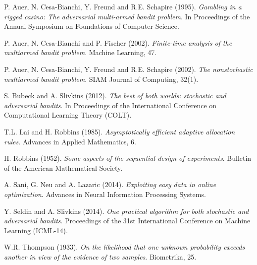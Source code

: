 \documentclass[11pt]{article}
\begin{document}
\pagebreak

\begin{thebibliography}{1}

 P. Auer, N. Cesa-Bianchi, Y. Freund and R.E. Schapire (1995). {\em Gambling in a rigged casino: The adversarial multi-armed bandit problem}. In Proceedings of the Annual Symposium on Foundations of Computer Science.

 P. Auer, N. Cesa-Bianchi and P. Fischer (2002). {\em Finite-time analysis of the multiarmed bandit problem}. Machine Learning, 47.

 P. Auer, N. Cesa-Bianchi, Y. Freund and R.E. Schapire (2002). {\em The nonstochastic multiarmed bandit problem}. SIAM Journal of Computing, 32(1).

 S. Bubeck and A. Slivkins (2012). {\em The best of both worlds: stochastic and adversarial bandits}. In Proceedings of the International Conference on Computational Learning Theory (COLT).

 T.L. Lai and H. Robbins (1985). {\em Asymptotically efficient adaptive allocation rules}. Advances in Applied Mathematics, 6.

 H. Robbins (1952). {\em Some aspects of the sequential design of experiments}.  Bulletin of the American Mathematical Society.

 A. Sani, G. Neu and A. Lazaric (2014). {\em Exploiting easy data in online optimization}.  Advances in Neural Information Processing Systems.

 Y. Seldin and A. Slivkins (2014). {\em One practical algorithm for both stochastic and adversarial bandits}.  Proceedings of the 31st International Conference on Machine Learning (ICML-14).

 W.R. Thompson (1933). {\em On the likelihood that one unknown probability exceeds another in view of the evidence of two samples}. Biometrika, 25.

\end{thebibliography}
\end{document}
